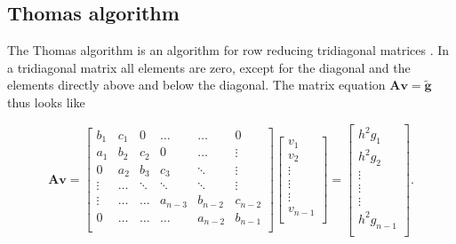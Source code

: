 \documentclass{emulateapj}
\begin{document}
    \subsection{Thomas algorithm}
    \label{sec:thomas}
    
        The Thomas algorithm is an algorithm for row reducing tridiagonal matrices \cite{thomasalg}. 
        In a tridiagonal matrix all elements are zero, except for the diagonal and the elements directly above and below the diagonal. The matrix equation \(\textbf{A}\textbf{v} = \widetilde{\textbf{g}}\) thus looks like
        
        \begin{equation*}
            \mathbf{A}\mathbf{v} = \begin{bmatrix}
               b_1    & c_1    & 0      & \ldots  & \ldots  & 0 \\
               a_1    & b_2    & c_2    & 0       & \ldots  & \vdots \\
               0      & a_2    & b_3    & c_3     & \ddots  & \vdots \\
               \vdots & \ldots & \ddots & \ddots  & \ddots  & \vdots \\
               \vdots & \ldots & \ldots & a_{n-3} & b_{n-2} & c_{n-2} \\
               0      & \ldots & \ldots & \ldots  & a_{n-2} & b_{n-1} \\
            \end{bmatrix}\begin{bmatrix}
                v_1\\
                v_2\\
                \vdots \\
                \vdots  \\
                \vdots \\
                v_{n-1}\\
            \end{bmatrix}
            =\begin{bmatrix}
                h^{2}g_{1} \\
                h^{2}g_{2} \\
                \vdots      \\
                \vdots      \\
                \vdots      \\
                h^{2}g_{n-1} \\
            \end{bmatrix}.
        \end{equation*}
        
\end{document}
